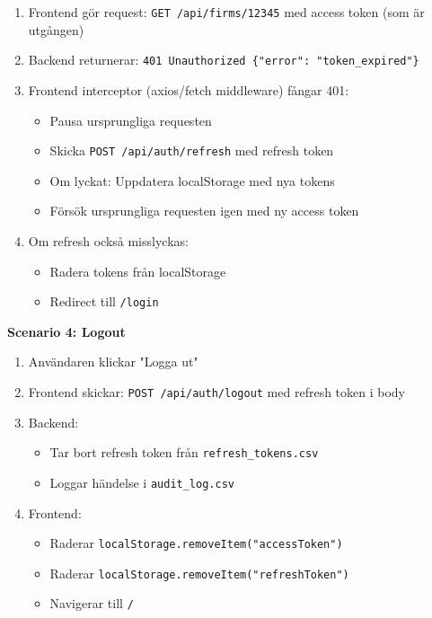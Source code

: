 \documentclass[12pt,a4paper]{article}
\begin{document}
\begin{enumerate}[noitemsep]
  \item Frontend gör request: \texttt{GET /api/firms/12345} med access token (som är utgången)
  \item Backend returnerar: \texttt{401 Unauthorized \{"error": "token\_expired"\}}
  \item Frontend interceptor (axios/fetch middleware) fångar 401:
    \begin{itemize}[noitemsep]
      \item Pausa ursprungliga requesten
      \item Skicka \texttt{POST /api/auth/refresh} med refresh token
      \item Om lyckat: Uppdatera localStorage med nya tokens
      \item Försök ursprungliga requesten igen med ny access token
    \end{itemize}
  \item Om refresh också misslyckas:
    \begin{itemize}[noitemsep]
      \item Radera tokens från localStorage
      \item Redirect till \texttt{/login}
    \end{itemize}
\end{enumerate}

\textbf{Scenario 4: Logout}

\begin{enumerate}[noitemsep]
  \item Användaren klickar "Logga ut"
  \item Frontend skickar: \texttt{POST /api/auth/logout} med refresh token i body
  \item Backend:
    \begin{itemize}[noitemsep]
      \item Tar bort refresh token från \texttt{refresh\_tokens.csv}
      \item Loggar händelse i \texttt{audit\_log.csv}
    \end{itemize}
  \item Frontend:
    \begin{itemize}[noitemsep]
      \item Raderar \texttt{localStorage.removeItem("accessToken")}
      \item Raderar \texttt{localStorage.removeItem("refreshToken")}
      \item Navigerar till \texttt{/}
    \end{itemize}
\end{enumerate}
\end{document}
